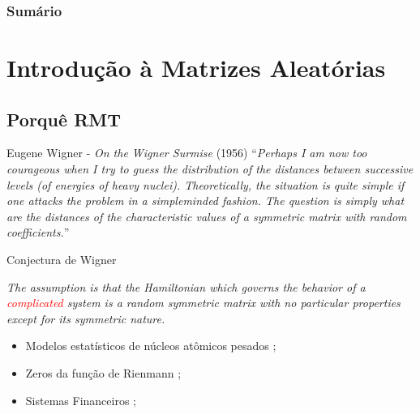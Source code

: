 




\frame{\titlepage}

{
\begin{frame}
\frametitle{Sumário}
\tableofcontents
\end{frame}
}


\section{Introdução à Matrizes Aleatórias}

\subsection{Porquê RMT}


\begin{frame}
	\begin{block}{Eugene Wigner - \textit{On the Wigner Surmise} (1956)}
	``\textit{Perhaps I am now too courageous when I try to guess the distribution of the distances between successive levels (of energies of heavy nuclei). Theoretically, the situation is quite simple if one attacks the problem in a simpleminded fashion. The question is simply what are the distances of the characteristic values of a symmetric matrix with random coefficients.}''
	\end{block}
\end{frame}

\begin{frame}
	\begin{block}{Conjectura de Wigner}
		\parbox{\linewidth}{\textit{The assumption is that
			the Hamiltonian which governs the behavior of
			a \textcolor{red}{complicated} system is a random symmetric
			matrix with no particular properties except for
			its symmetric nature.}}
	\end{block}

	\vspace{1cm}

	\pause
	\begin{itemize}
		\item Modelos estatísticos de núcleos atômicos pesados \cite{Wigner};
		\item Zeros da função de Rienmann \cite{montgomery};
		\item Sistemas Financeiros \cite[Chapter~2]{fabozziquantitative};
	\end{itemize}
	
	
\end{frame}

